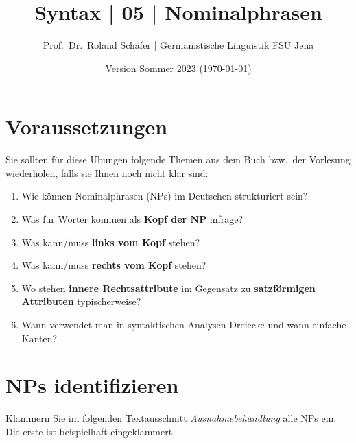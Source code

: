 \documentclass[12pt,a4paper,twoside]{article}
\author{Prof.\ Dr.\ Roland Schäfer | Germanistische Linguistik FSU Jena}
\title{Syntax | 05 | Nominalphrasen}
\date{Version Sommer 2023 (\today)}
\newcommand{\Lf}{
  \setlength{\itemsep}{1pt}
  \setlength{\parskip}{0pt}
  \setlength{\parsep}{0pt}
}
\begin{document}
\maketitle

\section*{Voraussetzungen}

Sie sollten für diese Übungen folgende Themen aus dem Buch bzw.\ der Vorlesung wiederholen, falls sie Ihnen noch nicht klar sind:

\begin{enumerate}\Lf
  \item Wie können Nominalphrasen (NPs) im Deutschen strukturiert sein? 
  \item Was für Wörter kommen als \textbf{Kopf der NP} infrage?
  \item Was kann\slash muss \textbf{links vom Kopf} stehen?
  \item Was kann\slash muss \textbf{rechts vom Kopf} stehen?
  \item Wo stehen \textbf{innere Rechtsattribute} im Gegensatz zu \textbf{satzförmigen Attributen} typischerweise?
  \item Wann verwendet man in syntaktischen Analysen Dreiecke und wann einfache Kanten?
\end{enumerate}

\section{NPs identifizieren}\label{sec:erkennen}

Klammern Sie im folgenden Textausschnitt \textit{Ausnahmebehandlung} alle NPs ein.
Die erste ist beispielhaft eingeklammert.
\end{document}
